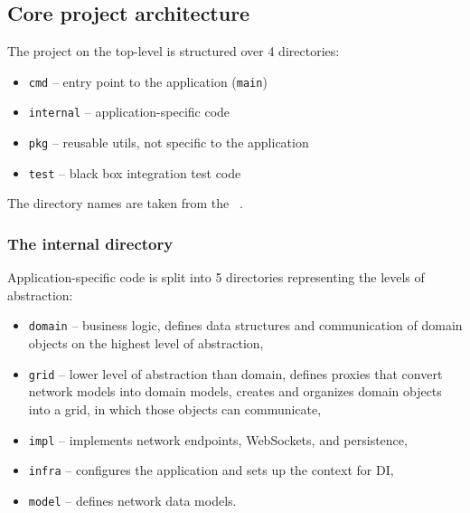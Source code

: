 \subsection{Core project architecture}\label{sec:core-project-architecture}

The project on the top-level is structured over 4 directories:

\begin{itemize}
      \item
            \texttt{cmd} -- entry point to the application (\texttt{main})
      \item
            \texttt{internal} -- application-specific code
      \item
            \texttt{pkg} -- reusable utils, not specific to the application
      \item
            \texttt{test} -- black box integration test code
\end{itemize}

The directory names are taken
from the ~\cite{quest_standard_2022}.

\subsubsection{The internal directory}\label{sec:the-internal-directory}

Application-specific code is split into 5 directories
representing the levels of abstraction:

\begin{itemize}
      \item
            \texttt{domain} -- business logic,
            defines data structures and communication of domain objects
            on the highest level of abstraction,
      \item
            \texttt{grid} -- lower level of abstraction than domain,
            defines proxies that convert network models into domain models,
            creates and organizes domain objects into a grid,
            in which those objects can communicate,
      \item
            \texttt{impl} -- implements network endpoints,
            WebSockets, and persistence,
      \item
            \texttt{infra} -- configures the application
            and sets up the context for DI,
      \item
            \texttt{model} -- defines network data models.
\end{itemize}
